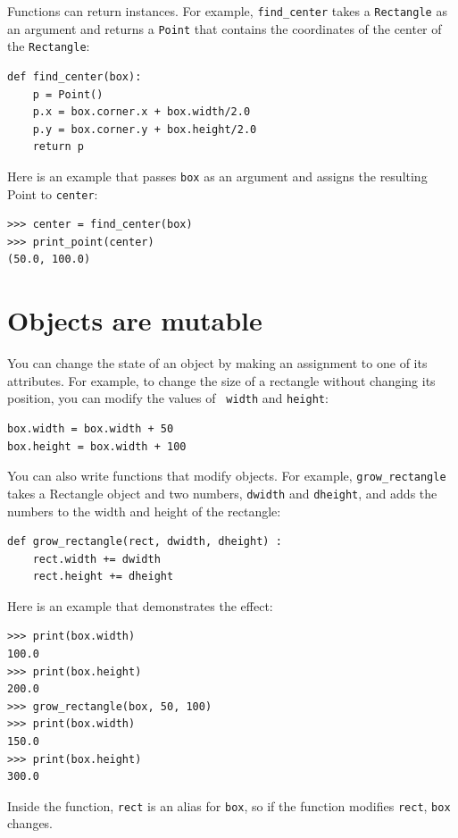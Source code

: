 \documentclass[10pt]{book}
\begin{document}

Functions can return instances.  For example, \verb"find_center"
takes a {\tt Rectangle} as an argument and returns a {\tt Point}
that contains the coordinates of the center of the {\tt Rectangle}:

\beforeverb
\begin{verbatim}
def find_center(box):
    p = Point()
    p.x = box.corner.x + box.width/2.0
    p.y = box.corner.y + box.height/2.0
    return p
\end{verbatim}
\afterverb
%
Here is an example that passes {\tt box} as an argument and assigns
the resulting Point to {\tt center}:

\beforeverb
\begin{verbatim}
>>> center = find_center(box)
>>> print_point(center)
(50.0, 100.0)
\end{verbatim}
\afterverb
%

\section{Objects are mutable}


You can change the state of an object by making an assignment to one of
its attributes.  For example, to change the size of a rectangle
without changing its position, you can modify the values of {\tt
width} and {\tt height}:

\beforeverb
\begin{verbatim}
box.width = box.width + 50
box.height = box.width + 100
\end{verbatim}
\afterverb
%
You can also write functions that modify objects.  For example,
\verb"grow_rectangle" takes a Rectangle object and two numbers,
{\tt dwidth} and {\tt dheight}, and adds the numbers to the
width and height of the rectangle:

\beforeverb
\begin{verbatim}
def grow_rectangle(rect, dwidth, dheight) :
    rect.width += dwidth
    rect.height += dheight
\end{verbatim}
\afterverb
%
Here is an example that demonstrates the effect:

\beforeverb
\begin{verbatim}
>>> print(box.width)
100.0
>>> print(box.height)
200.0
>>> grow_rectangle(box, 50, 100)
>>> print(box.width)
150.0
>>> print(box.height)
300.0
\end{verbatim}
\afterverb
%
Inside the function, {\tt rect} is an
alias for {\tt box}, so if the function modifies {\tt rect}, 
{\tt box} changes.
\end{document}

